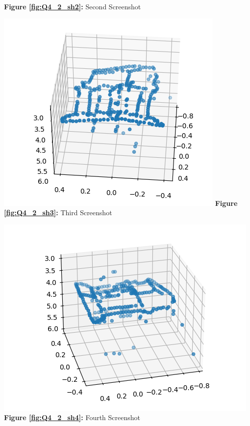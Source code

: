 \begin{your_solution}[title=Q4.2,height=17.5cm,width=\linewidth]
\begin{minipage}{0.45\linewidth}
	\textbf{Figure \ref{fig:Q4_2_sh2}:} Second Screenshot  %
	\label{fig:Q4_2_sh2}         %
\end{minipage}	
\newline
\begin{minipage}{0.45\linewidth}
	\centering
	\includegraphics[width=\linewidth]{../Q4_2_sh3.png}
	\textbf{Figure \ref{fig:Q4_2_sh3}:} Third Screenshot  %
	\label{fig:Q4_2_sh3}         %
\end{minipage}
\hfill
\begin{minipage}{0.55\linewidth}
	\centering
	\includegraphics[width=\linewidth]{../Q4_2_sh4.png}
	\textbf{Figure \ref{fig:Q4_2_sh4}:} Fourth Screenshot  %
	\label{fig:Q4_2_sh4}         %
\end{minipage}	
\end{your_solution}
